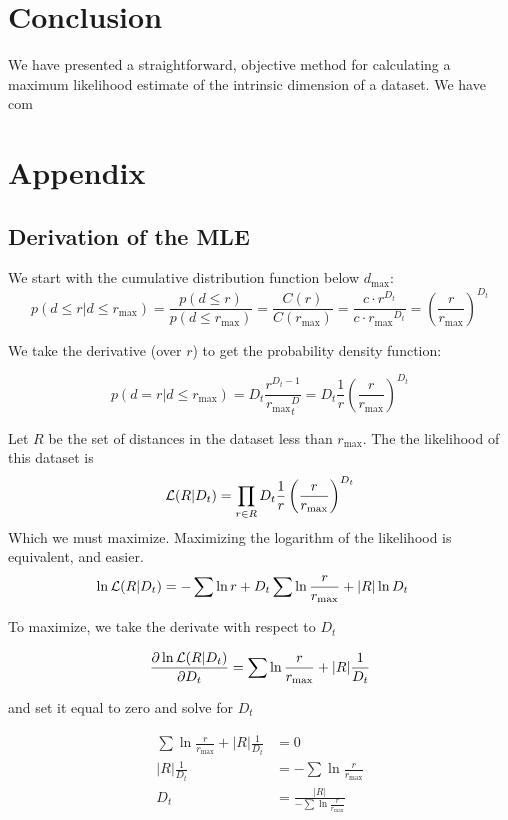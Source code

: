 \documentclass[11pt]{article}
\begin{document}
\section{Conclusion}

We have presented a straightforward, objective method for calculating a maximum likelihood estimate of the intrinsic dimension of a dataset. We have com 

\section{Appendix}

\subsection{Derivation of the MLE}

We start with the cumulative distribution function below $d_{\max}$:
\[
p(d \leq r | d \leq r_{\max}) = \frac{p(d \leq r)}{p(d \leq r_{\max})} = \frac{C(r)}{C(r_{\max})} = \frac{c \cdot r^{D_t}}{c \cdot {r_{\max}} ^ {D_t}} = \left ( \frac{r}{r_{\max}} \right )^{D_t}
\]

We take the derivative (over $r$) to get the probability density function:

\[
p(d = r | d \leq r_{\max}) = D_t \frac{r^{D_t-1}}{{r_{\max}}^D_t} = D_t \frac{1}{r} \left (\frac{r}{r_{\max}} \right ) ^ {D_t} 
\]

Let $R$ be the set of distances in the dataset less than $r_{\max}$. The the likelihood of this dataset is
\[
{\cal L}(R|D_t) = \prod_{r \in R} D_t \frac{1}{r} \left (\frac{r}{r_{\max}} \right ) ^ {D_t} 
\] 
Which we must maximize. Maximizing the logarithm of the likelihood is equivalent, and easier.
\begin{align*}
\ln {\cal L}(R|D_t) &= -\sum \ln r + D_t \sum \ln \frac{r}{r_{\max}} + |R| \ln D_t
\end{align*}

To maximize, we take the derivate with respect to $D_t$

\begin{align*}
\frac{\partial \ln{\cal L}(R|D_t)}{\partial D_t} = \sum{\ln \frac{r}{r_{\max}}} + |R|\frac{1}{D_t}
\end{align*}

and set it equal to zero and solve for $D_t$

\begin{align*}
\sum{\ln \frac{r}{r_{\max}}} + |R|\frac{1}{D_t} &= 0 \\
|R|\frac{1}{D_t} &= - \sum{\ln \frac{r}{r_{\max}}} \\
D_t &= \frac{|R|}{- \sum{\ln \frac{r}{r_{\max}}}} 
\end{align*}
\end{document}
